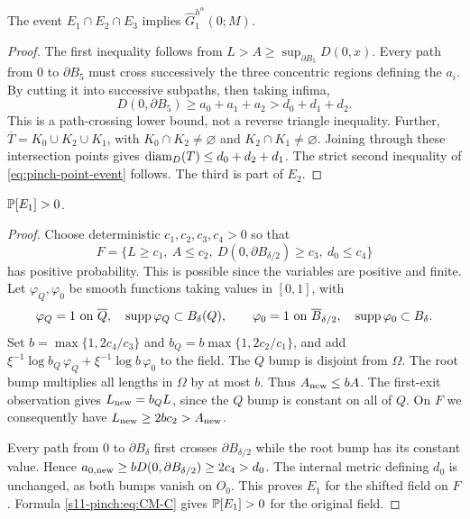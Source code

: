 \documentclass[12pt]{amsart}
\numberwithin{equation}{section}
\begin{document}
\begin{lemma}\label{s11-pinch:lem:include}
The event $E_1\cap E_2\cap E_3$ implies
$\widehat G_1^{h^\alpha}(0;M)$.
\end{lemma}
\begin{proof}
The first inequality follows from
$L>A\ge\sup_{\partial B_5}D(0,x)$.
Every path from $0$ to $\partial B_5$ must cross successively
the three concentric regions defining the $a_i$.
By cutting it into successive subpaths, then taking infima,
\[
 D(0,\partial B_5)\ge a_0+a_1+a_2>d_0+d_1+d_2.
\]
This is a path-crossing lower bound, not a reverse triangle
inequality. Further,
$\overline T=K_0\cup K_2\cup K_1$, with
$K_0\cap K_2\ne\varnothing$ and $K_2\cap K_1\ne\varnothing$.
Joining through these intersection points gives
$\diam_D(T)\le d_0+d_2+d_1$. The strict second inequality
of \eqref{eq:pinch-point-event} follows. The third is part of $E_2$.
\end{proof}

\begin{lemma}\label{s11-pinch:lem:E1}
$\P[E_1]>0$.
\end{lemma}
\begin{proof}
Choose deterministic $c_1,c_2,c_3,c_4>0$ so that
\[
 F=\{L\ge c_1,\ A\le c_2,\
      D(0,\partial B_{\delta/2})\ge c_3,\ d_0\le c_4\}
\]
has positive probability. This is possible since the variables
are positive and finite. Let $\varphi_Q,\varphi_0$ be smooth
functions taking values in $[0,1]$, with
\[
 \varphi_Q=1\ \hbox{on }\overline Q,\quad
 \operatorname{supp}\varphi_Q\subset B_\delta(Q),\qquad
 \varphi_0=1\ \hbox{on }\overline B_{\delta/2},\quad
 \operatorname{supp}\varphi_0\subset B_\delta.
\]
Set $b=\max\{1,2c_4/c_3\}$ and
$b_Q=b\max\{1,2c_2/c_1\}$, and add
$\xi^{-1}\log b_Q\,\varphi_Q+
 \xi^{-1}\log b\,\varphi_0$ to the field.
The $Q$ bump is disjoint from $\Omega$. The root bump multiplies
all lengths in $\Omega$ by at most $b$. Thus $A_{\rm new}\le bA$.
The first-exit observation gives $L_{\rm new}=b_Q L$,
since the $Q$ bump is constant on all of $Q$.
On $F$ we consequently have
$L_{\rm new}\ge2bc_2>A_{\rm new}$.

Every path from $0$ to $\partial B_\delta$ first crosses
$\partial B_{\delta/2}$ while the root bump has its constant
value. Hence
$a_{0,\rm new}\ge bD(0,\partial B_{\delta/2})\ge2c_4>d_0$.
The internal metric defining $d_0$ is unchanged, as both bumps
vanish on $O_0$. This proves $E_1$ for the shifted field on $F$.
Formula \eqref{s11-pinch:eq:CM-C} gives $\P[E_1]>0$ for the original field.
\end{proof}
\end{document}
